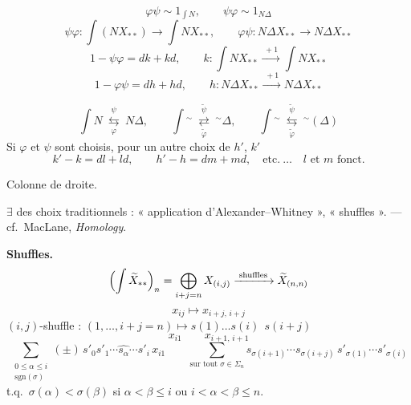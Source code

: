 \documentclass[11pt,a4paper]{article}
\begin{document}

\[
\varphi\psi \sim 1_{\int N} , \qquad \psi\varphi \sim 1_{N\Delta}
\]
\[
\psi\varphi \colon \int (N X_{**}) \longrightarrow \int N X_{**} ,
\qquad
\varphi\psi \colon N\Delta X_{**} \longrightarrow N\Delta X_{**}
\]
\[
1 - \psi\varphi = dk + kd , \qquad k \colon \int N X_{**} \xrightarrow{\;+1\;} \int N X_{**}
\]
\[
1 - \varphi\psi = dh + hd , \qquad h \colon N\Delta X_{**} \xrightarrow{\;+1\;} N\Delta X_{**}
\]

\[
\int N \ \overset{\psi}{\underset{\varphi}{\leftrightarrows}} \ N\Delta ,
\qquad
\int {}^\sim \ \overset{\tilde{\psi}}{\underset{\tilde{\varphi}}{\rightleftarrows}} \ {}^\sim\Delta ,
\qquad
\int {}^\sim \ \overset{\tilde{\psi}}{\underset{\tilde{\varphi}}{\leftrightarrows}} \ {}^\sim(\Delta)
\]
Si $\varphi$ et $\psi$ sont choisis, pour un autre choix de $h'$, $k'$
\[
k' - k = dl + ld , \qquad h' - h = dm + md , \quad \text{etc.}\ \ldots \quad \text{$l$ et $m$ fonct.}
\]

Colonne de droite.

$\exists$ des choix traditionnels : « application d’Alexander--Whitney », « shuffles ». — cf.\ MacLane, \emph{Homology}.

\textbf{Shuffles.}
\[
\Bigl( \int \widetilde{X}_{**} \Bigr)_n = \bigoplus_{i+j=n} X_{(i,j)} \xrightarrow{\;\text{shuffles}\;} \widetilde{X}_{(n,n)}
\]
\[
x_{ij} \longmapsto x_{i+j,\,i+j}
\]
$(i,j)$-shuffle : $(1 , \ldots , i+j = n) \mapsto s(1) \ldots s(i) \ \ s(i+j)$
\[
x_{i1} \qquad x_{i+1,\,i+1}
\]
\[
\sum_{\substack{0 \le \alpha \le i \\ \mathrm{sgn}(\sigma)}} (\pm)\, s'_0 s'_1 \cdots \widehat{s_\alpha} \cdots s'_i \, x_{i1}
\qquad
\sum_{\text{sur tout } \sigma \in \Sigma_n} s_{\sigma(i+1)} \cdots s_{\sigma(i+j)} \, s'_{\sigma(1)} \cdots s'_{\sigma(i)}
\]
t.q.\ $\sigma(\alpha) < \sigma(\beta)$ si $\alpha < \beta \le i$ ou \struck{\ill{}} $i < \alpha < \beta \le n$.
\end{document}
